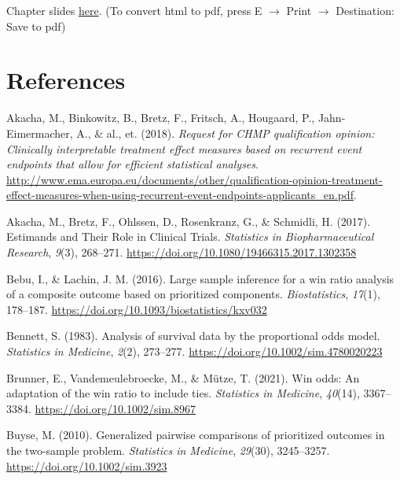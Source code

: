 \documentclass[
  letterpaper,
  DIV=11,
  numbers=noendperiod]{scrreprt}
\newlength{\cslhangindent}
\newlength{\cslentryspacingunit} %
\newenvironment{CSLReferences}[2] %
 {%
  \setlength{\parindent}{0pt}
  \ifodd #1
  \let\oldpar\par
  \def\par{\hangindent=\cslhangindent\oldpar}
  \fi
  \setlength{\parskip}{#2\cslentryspacingunit}
 }%
 {}
\begin{document}

Chapter slides \href{chap5.html}{here}. (To convert html to pdf, press E
\(\to\) Print \(\to\) Destination: Save to pdf)


\hypertarget{references}{%
\chapter*{References}\label{references}}


\hypertarget{refs}{}
\begin{CSLReferences}{1}{0}
\leavevmode{}%
Akacha, M., Binkowitz, B., Bretz, F., Fritsch, A., Hougaard, P.,
Jahn-Eimermacher, A., \& al., et. (2018). \emph{Request for CHMP
qualification opinion: Clinically interpretable treatment effect
measures based on recurrent event endpoints that allow for efficient
statistical analyses}.
\url{http://www.ema.europa.eu/documents/other/qualification-opinion-treatment-effect-measures-when-using-recurrent-event-endpoints-applicants_en.pdf}.

\leavevmode{}%
Akacha, M., Bretz, F., Ohlssen, D., Rosenkranz, G., \& Schmidli, H.
(2017). Estimands and Their Role in Clinical Trials. \emph{Statistics in
Biopharmaceutical Research}, \emph{9}(3), 268--271.
\url{https://doi.org/10.1080/19466315.2017.1302358}

\leavevmode{}%
Bebu, I., \& Lachin, J. M. (2016). Large sample inference for a win
ratio analysis of a composite outcome based on prioritized components.
\emph{Biostatistics}, \emph{17}(1), 178--187.
\url{https://doi.org/10.1093/biostatistics/kxv032}

\leavevmode{}%
Bennett, S. (1983). Analysis of survival data by the proportional odds
model. \emph{Statistics in Medicine}, \emph{2}(2), 273--277.
\url{https://doi.org/10.1002/sim.4780020223}

\leavevmode{}%
Brunner, E., Vandemeulebroecke, M., \& Mütze, T. (2021). Win odds: An
adaptation of the win ratio to include ties. \emph{Statistics in
Medicine}, \emph{40}(14), 3367--3384.
\url{https://doi.org/10.1002/sim.8967}

\leavevmode{}%
Buyse, M. (2010). Generalized pairwise comparisons of prioritized
outcomes in the two{-}sample problem. \emph{Statistics in Medicine},
\emph{29}(30), 3245--3257. \url{https://doi.org/10.1002/sim.3923}


\end{CSLReferences}
\end{document}
